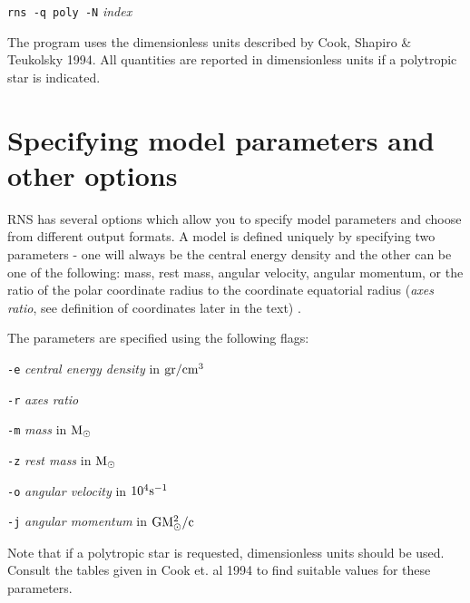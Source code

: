 \vspace{0.3cm}

{\tt rns -q poly -N} {\it index}

\vspace{0.3cm}

The program uses the dimensionless units described by 
Cook, Shapiro \& Teukolsky 1994. All quantities are
reported in dimensionless units if a polytropic star
is indicated.


\section{Specifying model parameters and other options}

RNS has several options which allow you to specify model parameters and choose 
from different output formats. A model is defined uniquely by specifying two
parameters - one will always be the central energy density and the other
can be one of the following: mass, rest mass, angular velocity, 
angular momentum, or the ratio of the polar coordinate radius to the 
coordinate equatorial radius ({\it axes ratio}, see definition of coordinates 
later in the text) .

\vspace{0.3cm}
  
\<The parameters are specified using the following flags:
 
\begin{description}

\item{\tt -e} {\it central energy density} in ${\rm gr/cm^3}$

\item{\tt -r} {\it axes ratio}

\item{\tt -m} {\it mass} in ${\rm M}_{\odot}$

\item{\tt -z} {\it rest mass} in ${\rm M_{\odot}}$

\item{\tt -o} {\it angular velocity} in ${\rm 10^4 s^{-1}}$

\item{\tt -j} {\it angular momentum} in ${\rm GM_{\odot}^2/c}$
 
\end{description}




\< Note that if a polytropic star is requested, dimensionless 
units should be used. Consult the tables given in
Cook et. al 1994 to find suitable values for these parameters.

